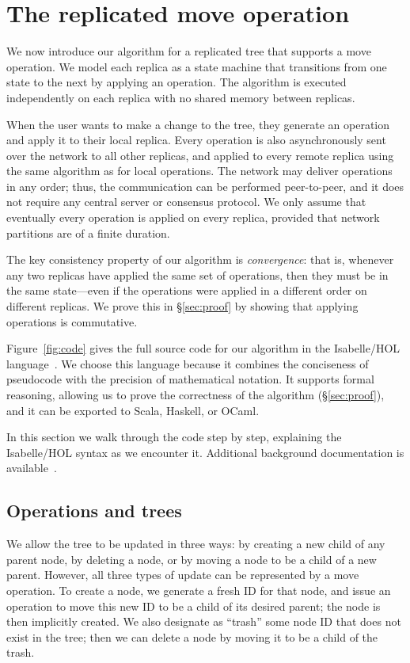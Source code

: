 \documentclass[10pt,journal,compsoc]{IEEEtran}
\begin{document}
\section{The replicated move operation}\label{sec:algorithm}

We now introduce our algorithm for a replicated tree that supports a move operation.
We model each replica as a state machine that transitions from one state to the next by applying an operation.
The algorithm is executed independently on each replica with no shared memory between replicas.

When the user wants to make a change to the tree, they generate an operation and apply it to their local replica.
Every operation is also asynchronously sent over the network to all other replicas, and applied to every remote replica using the same algorithm as for local operations.
The network may deliver operations in any order; thus, the communication can be performed peer-to-peer, and it does not require any central server or consensus protocol.
We only assume that eventually every operation is applied on every replica, provided that network partitions are of a finite duration.

The key consistency property of our algorithm is \emph{convergence}: that is, whenever any two replicas have applied the same set of operations, then they must be in the same state---even if the operations were applied in a different order on different replicas.
We prove this in \S\ref{sec:proof} by showing that applying operations is commutative.

Figure~\ref{fig:code} gives the full source code for our algorithm in the Isabelle/HOL language~\cite{DBLP:conf/tphol/WenzelPN08}.
We choose this language because it combines the conciseness of pseudocode with the precision of mathematical notation.
It supports formal reasoning, allowing us to prove the correctness of the algorithm (\S\ref{sec:proof}), and it can be exported to Scala, Haskell, or OCaml.

In this section we walk through the code step by step, explaining the Isabelle/HOL syntax as we encounter it.
Additional background documentation is available~\cite{DBLP:books/sp/NipkowK14}.

\subsection{Operations and trees}\label{sec:ops-trees}

We allow the tree to be updated in three ways: by creating a new child of any parent node, by deleting a node, or by moving a node to be a child of a new parent.
However, all three types of update can be represented by a move operation.
To create a node, we generate a fresh ID for that node, and issue an operation to move this new ID to be a child of its desired parent; the node is then implicitly created.
We also designate as ``trash'' some node ID that does not exist in the tree; then we can delete a node by moving it to be a child of the trash.
\end{document}
